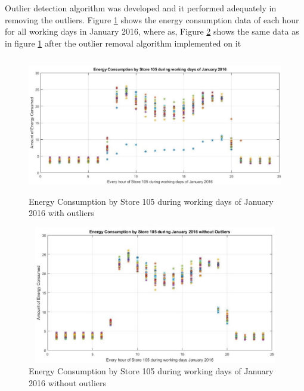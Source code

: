\documentclass[conference]{IEEEtran}
\begin{document}
Outlier detection algorithm was developed and it performed adequately in removing the outliers. Figure \ref{fig:OLX} shows the energy consumption data of each hour for all working days in January 2016, where as, Figure \ref{fig:OLX1} shows the
same data as in figure \ref{fig:OLX} after the outlier removal algorithm implemented
on it
\begin{figure}[h]
	\centering
	\includegraphics[width=13cm,height=6cm]{with_OL.jpg}
	\caption{Energy Consumption by Store 105 during working days of January
		2016 with outliers}
	\label{fig:OLX}
\end{figure}
\begin{figure}[h]
	\centering
	\includegraphics[width=13cm,height=6cm]{without_OL.jpg}
	\caption{Energy Consumption by Store 105 during working days of January
		2016 without outliers}
	\label{fig:OLX1}
\end{figure}
\end{document}
